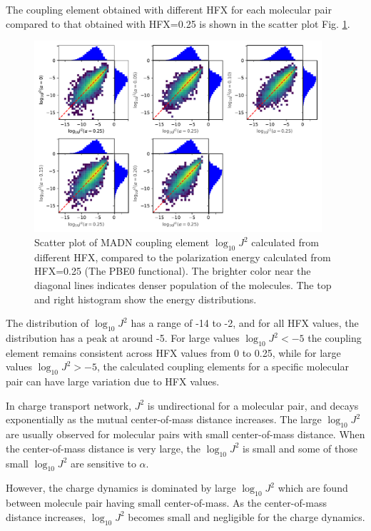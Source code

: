 \documentclass[letterpaper,12pt]{article}
\begin{document}
The coupling element obtained with different HFX for each molecular pair compared to that obtained with HFX=0.25 is shown in the scatter plot Fig. \ref{fig:J_MADN}.
\begin{figure}[H]
    \centering
    \includegraphics[width=0.95\textwidth]{figs/MADN_HFX/scatterJ_all.pdf}
    \caption{Scatter plot of MADN coupling element $\log_{10} J^2$ calculated from different HFX, compared to the polarization energy calculated from HFX=0.25 (The PBE0 functional). The brighter color near the diagonal lines indicates denser population of the molecules.  The top and right histogram show the energy distributions.}
    \label{fig:J_MADN}
\end{figure}

The distribution of $\log_{10} J^2$ has a range of -14 to -2, and for all HFX values, the distribution has a peak at around -5. 
For large values $\log_{10} J^2 < -5$ the coupling element remains consistent across HFX values from 0 to 0.25, while for large values $\log_{10} J^2 > -5$, the calculated coupling elements for a specific molecular pair can have large variation due to HFX values. 

In charge transport network, $J^2$ is undirectional for a molecular pair, and decays exponentially as the mutual center-of-mass distance increases. The large $\log_{10} J^2$ are usually observed for molecular pairs with small center-of-mass distance. 
When the center-of-mass distance is very large, the $\log_{10} J^2$ is small and some of those small $\log_{10} J^2$ are sensitive to $\alpha$. 

However, the charge dynamics is dominated by large $\log_{10} J^2$ which are found between molecule pair having small center-of-mass. As the center-of-mass distance increases, $\log_{10} J^2$ becomes small and negligible for the charge dynamics.
\end{document}
